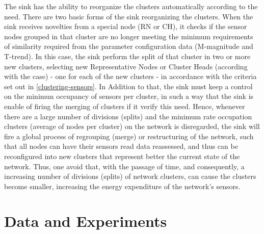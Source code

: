 \documentclass[conference]{IEEEtran}
\begin{document}
The sink has the ability to reorganize the clusters automatically according to
the need. There are two basic forms of the sink reorganizing the clusters. When
the sink receives novelties from a special node (RN or CH), it checks if the
sensor nodes grouped in that cluster are no longer meeting the minimum
requirements of similarity required from the parameter configuration data
(M-magnitude and T-trend). In this case, the sink perform the split of that
cluster in two or more new clusters, selecting new Representative Nodes or
Cluster Heads (according with the case) - one for each of the new clusters - in
accordance with the criteria set out in \ref{clustering-sensors}. In Addition to
that, the sink must keep a control on the minimun occupancy of sensors per
cluster, in such a way that the sink is enable of firing the merging of clusters
if it verify this need. Hence, whenever there are a large number of divisions
(splits) and the minimum rate occupation clusters (average of nodes per cluster)
on the network is disregarded, the sink will fire a global process of regrouping
(merge) or restructuring of the network, such that all nodes can have their
sensors read data reassessed, and thus can be reconfigured into new clusters
that represent better the current state of the network. Thus, one avoid that,
with the passage of time, and consequently, a increasing number of divisions
(splits) of network clusters, can cause the clusters become smaller, increasing
the energy expenditure of the network's sensors.


% 

\section{Data and Experiments}
\label{data-and-experiments}
\end{document}
